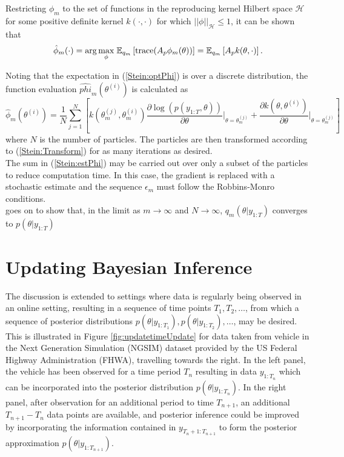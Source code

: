 \documentclass[
12pt, %
onehalfspacing, %
nohyperref, %
headsepline, %
chapterinoneline, %
]{MastersDoctoralThesis} %
\begin{document}
Restricting $\phi_m$ to the set of functions in the reproducing kernel Hilbert space $\mathcal{H}$ for some positive definite kernel $k(\cdot, \cdot)$ for which $||\phi||_{\mathcal{H}} \leq 1$, it can be shown that
\begin{equation}
\label{Stein:optPhi}
\hat{\phi}_m(\cdot) = \arg \underset{\phi}{\max} \hspace{1mm} \mathbb{E}_{q_m} \left[ \mbox{trace}(A_p \phi_m(\theta)) \right] = \mathbb{E}_{q_m} \left[ A_p k(\theta, \cdot) \right].
\end{equation}

Noting that the expectation in (\ref{Stein:optPhi}) is over a discrete distribution, the function evaluation $\hat{phi}_m(\theta^{(i)})$ is calculated as
\begin{equation}
\label{Stein:estPhi}
\hat{\phi}_m(\theta^{(i)}) = \frac{1}{N} \sum_{j=1}^N \left[ k(\theta_m^{(j)}, \theta_m^{(i)}) \frac{\partial \log(p(y_{1:T}, \theta))}{\partial \theta} \bigg \vert_{\theta = \theta^{(j)}_m} + \frac{\partial k(\theta, \theta^{(i)})}{\partial \theta} \bigg \vert_{\theta = \theta^{(j)}_m} \right]
\end{equation}
where $N$ is the number of particles. The particles are then transformed according to (\ref{Stein:Transform}) for as many iterations as desired.
\\

The sum in (\ref{Stein:estPhi}) may be carried out over only a subset of the particles to reduce computation time. In this case, the gradient is replaced with a stochastic estimate and the sequence $\epsilon_m$ must follow the Robbins-Monro conditions.
\\

\cite{Liu2017} goes on to show that, in the limit as $m \rightarrow \infty$ and $N \rightarrow \infty$, $q_m(\theta | y_{1:T})$ converges to $p(\theta | y_{1:T})$ 


\section{Updating Bayesian Inference}
\label{sec:UpdateBayes}

The discussion is extended to settings where data is regularly being observed in an online setting, resulting in a sequence of time points $T_1, T_2, \ldots$, from which a sequence of posterior distributions $p(\theta | y_{1:T_1}), p(\theta | y_{1:T_2}), \ldots$, may be desired.
\\

This is illustrated in Figure \ref{fig:updatetimeUpdate} for data taken from vehicle in the Next Generation Simulation (NGSIM) dataset provided by the US Federal Highway Administration (FHWA), travelling towards the right. In the left panel, the vehicle has been observed for a time period $T_{n}$ resulting in data $y_{1:T_{n}}$ which can be incorporated into the posterior distribution $p(\theta | y_{1:T_{n}})$. In the right panel, after observation for an additional period to time $T_{n+1}$, an additional $T_{n+1} - T_{n}$ data points are available, and posterior inference could be improved by incorporating the information contained in $y_{T_{n}+1:T_{n+1}}$ to form the posterior approximation $p(\theta | y_{1:T_{n+1}})$.
\end{document}
